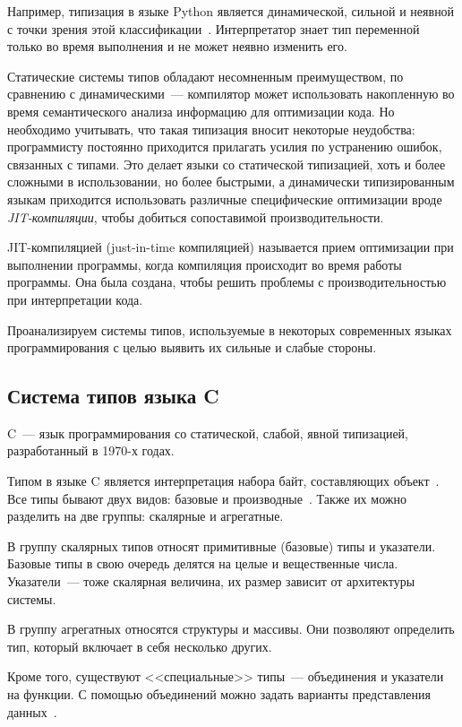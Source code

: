 Например, типизация в языке Python является динамической, сильной и неявной с точки зрения этой классификации~\cite{PythonWiki}.
Интерпретатор знает тип переменной только во время выполнения и не может неявно изменить его.

Статические системы типов обладают несомненным преимуществом, по сравнению с динамическими~--- компилятор может использовать накопленную во время семантического анализа информацию для оптимизации кода.
Но необходимо учитывать, что такая типизация вносит некоторые неудобства: программисту постоянно приходится прилагать усилия по устранению ошибок, связанных с типами.
Это делает языки со статической типизацией, хоть и более сложными в использовании, но более быстрыми, а динамически типизированным языкам приходится использовать различные специфические оптимизации вроде \textit{JIT-компиляции}, чтобы добиться сопоставимой производительности.

JIT-компиляцией (just-in-time компиляцией) называется прием оптимизации при выполнении программы, когда компиляция происходит во время работы программы.
Она была создана, чтобы решить проблемы с производительностью при интерпретации кода.

Проанализируем системы типов, используемые в некоторых современных языках программирования с целью выявить их сильные и слабые стороны.

\subsection{Система типов языка C}
\label{subsec:c_type_system}

C~--- язык программирования со статической, слабой, явной типизацией, разработанный в 1970-х годах.

Типом в языке C является интерпретация набора байт, составляющих объект~\cite{CSpec}.
Все типы бывают двух видов: базовые и производные~.
Также их можно разделить на две группы: скалярные и агрегатные.

В группу скалярных типов относят примитивные (базовые) типы и указатели.
Базовые типы в свою очередь делятся на целые и вещественные числа.
Указатели~--- тоже скалярная величина, их размер зависит от архитектуры системы.

В группу агрегатных относятся структуры и массивы.
Они позволяют определить тип, который включает в себя несколько других.

Кроме того, существуют <<специальные>> типы~--- объединения и указатели на функции.
С помощью объединений можно задать варианты представления данных~.

